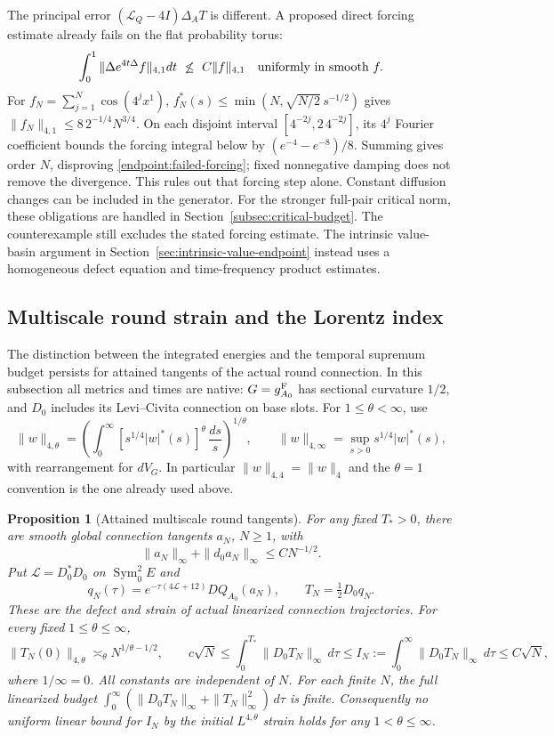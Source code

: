 \documentclass[11pt]{article}
\numberwithin{equation}{section}
\newtheorem{proposition}[theorem]{Proposition}
\theoremstyle{definition}
\theoremstyle{remark}
\begin{document}
The principal error $(\mathscr L_Q-4I)\Delta_A T$ is different.
A proposed direct forcing estimate already fails on the flat
probability torus:
\begin{equation}\label{endpoint:failed-forcing}
 \int_0^1\|\Delta e^{4t\Delta}f\|_{4,1}dt
 \ \not\le\ C\|f\|_{4,1}\quad\hbox{uniformly in smooth }f.
\end{equation}
For $f_N=\sum_{j=1}^N\cos(4^j x^1)$,
$f_N^*(s)\le\min(N,\sqrt{N/2}\,s^{-1/2})$ gives
$\|f_N\|_{4,1}\le8\,2^{-1/4}N^{3/4}$.
On each disjoint interval $[4^{-2j},2\,4^{-2j}]$, its $4^j$
Fourier coefficient bounds the forcing integral below by
$(e^{-4}-e^{-8})/8$.  Summing gives order $N$, disproving
\eqref{endpoint:failed-forcing}; fixed nonnegative damping does not
remove the divergence.  This rules out that forcing step alone.
Constant diffusion changes can be included in the generator.
For the stronger full-pair critical norm, these obligations are
handled in Section~\ref{subsec:critical-budget}. The counterexample
still excludes the stated forcing estimate. The intrinsic value-basin
argument in Section~\ref{sec:intrinsic-value-endpoint} instead uses
a homogeneous defect equation and time-frequency product estimates.

\subsection{Multiscale round strain and the Lorentz index}
\label{subsec:round-multiscale}
The distinction between the integrated energies and the temporal
supremum budget persists for attained tangents of the actual round
connection. In this subsection all metrics and times are native:
\(G=g^{\rm F}_{A_0}\) has sectional curvature \(1/2\), and
\(D_0\) includes its Levi--Civita connection on base slots.
For \(1\le\theta<\infty\), use
\[
 \|w\|_{4,\theta}
 =\left(\int_0^\infty
       [s^{1/4}|w|^*(s)]^\theta\,\frac{ds}{s}\right)^{1/\theta},
 \qquad
 \|w\|_{4,\infty}=\sup_{s>0}s^{1/4}|w|^*(s),
\]
with rearrangement for \(dV_G\). In particular
\(\|w\|_{4,4}=\|w\|_4\) and the \(\theta=1\) convention
is the one already used above.

\begin{proposition}[Attained multiscale round tangents]
\label{prop:round-multiscale}
For any fixed \(T_*>0\), there are smooth global connection
tangents \(a_N\), \(N\ge1\), with
\[
 \|a_N\|_\infty+\|d_0a_N\|_\infty\le C N^{-1/2}.
\]
Put \(\mathcal L=D_0^*D_0\) on \(\operatorname{Sym}^2_0E\) and
\[
 q_N(\tau)=e^{-\tau(4\mathcal L+12)}DQ_{A_0}(a_N),
 \qquad T_N=\tfrac12D_0q_N .
\]
These are the defect and strain of actual linearized connection
trajectories. For every fixed \(1\le\theta\le\infty\),
\[
 \|T_N(0)\|_{4,\theta}\asymp_\theta N^{1/\theta-1/2},
 \qquad
 c\sqrt N\le
 \int_0^{T_*}\|D_0T_N\|_\infty\,d\tau
 \le I_N:=\int_0^\infty\|D_0T_N\|_\infty\,d\tau
 \le C\sqrt N ,
\]
where \(1/\infty=0\). All constants are independent of \(N\).
For each finite \(N\), the full linearized budget
\(\int_0^\infty(\|D_0T_N\|_\infty+\|T_N\|_\infty^2)\,d\tau\)
is finite. Consequently no uniform linear bound for \(I_N\)
by the initial \(L^{4,\theta}\) strain holds for any
\(1<\theta\le\infty\).
\end{proposition}
\end{document}
